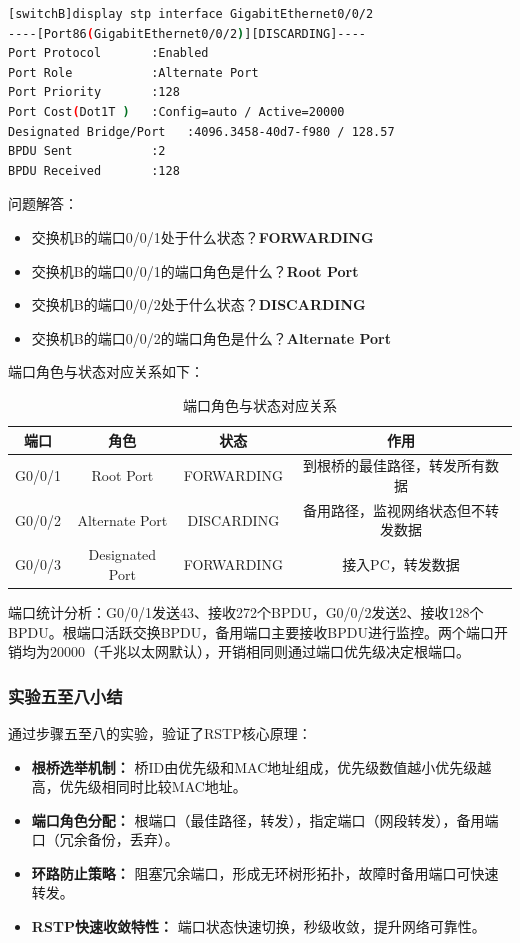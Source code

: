\documentclass[a4paper]{article}
\begin{document}
\begin{lstlisting}[language=bash]
[switchB]display stp interface GigabitEthernet0/0/2
----[Port86(GigabitEthernet0/0/2)][DISCARDING]----
Port Protocol       :Enabled
Port Role           :Alternate Port
Port Priority       :128
Port Cost(Dot1T )   :Config=auto / Active=20000
Designated Bridge/Port   :4096.3458-40d7-f980 / 128.57
BPDU Sent           :2
BPDU Received       :128
\end{lstlisting}

问题解答：
\begin{itemize}
    \item 交换机B的端口0/0/1处于什么状态？\textbf{FORWARDING}
    \item 交换机B的端口0/0/1的端口角色是什么？\textbf{Root Port}
    \item 交换机B的端口0/0/2处于什么状态？\textbf{DISCARDING}
    \item 交换机B的端口0/0/2的端口角色是什么？\textbf{Alternate Port}
\end{itemize}

端口角色与状态对应关系如下：

\begin{table}[H]
    \centering
    \begin{tabular}{|c|c|c|c|}
        \hline
        端口 & 角色 & 状态 & 作用 \\
        \hline
        G0/0/1 & Root Port & FORWARDING & 到根桥的最佳路径，转发所有数据 \\
        G0/0/2 & Alternate Port & DISCARDING & 备用路径，监视网络状态但不转发数据 \\
        G0/0/3 & Designated Port & FORWARDING & 接入PC，转发数据 \\
        \hline
    \end{tabular}
    \caption{端口角色与状态对应关系}
\end{table}
端口统计分析：G0/0/1发送43、接收272个BPDU，G0/0/2发送2、接收128个BPDU。根端口活跃交换BPDU，备用端口主要接收BPDU进行监控。两个端口开销均为20000（千兆以太网默认），开销相同则通过端口优先级决定根端口。

\subsubsection{实验五至八小结}

通过步骤五至八的实验，验证了RSTP核心原理：
\begin{itemize}
    \item \textbf{根桥选举机制：} 桥ID由优先级和MAC地址组成，优先级数值越小优先级越高，优先级相同时比较MAC地址。
    \item \textbf{端口角色分配：} 根端口（最佳路径，转发），指定端口（网段转发），备用端口（冗余备份，丢弃）。
    \item \textbf{环路防止策略：} 阻塞冗余端口，形成无环树形拓扑，故障时备用端口可快速转发。
    \item \textbf{RSTP快速收敛特性：} 端口状态快速切换，秒级收敛，提升网络可靠性。
\end{itemize}
\end{document}
